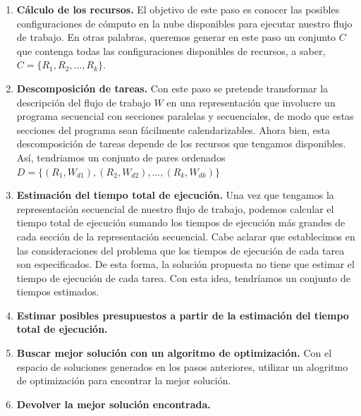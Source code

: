 \documentclass[letterpaper, 12pt]{report}
\begin{document}
\begin{enumerate}
\item \textbf{Cálculo de los recursos.} El objetivo de este paso es conocer las posibles configuraciones de cómputo en la nube disponibles para ejecutar nuestro flujo de trabajo. En otras palabras, queremos generar en este paso un conjunto $C$ que contenga todas las configuraciones disponibles de recursos, a saber, $C = \{ R_1, R_2, \dots, R_k \}$.
\item \textbf{Descomposición de tareas.} Con este paso se pretende transformar la descripción del flujo de trabajo $W$ en una representación que involucre un programa secuencial con secciones paralelas y secuenciales, de modo que estas secciones del programa sean fácilmente calendarizables. Ahora bien, esta descomposición de tareas depende de los recursos que tengamos disponibles. Así, tendriamos un conjunto de pares ordenados $D =\{(R_1, W_{d1}), (R_2, W_{d2}), \dots, (R_k, W_{dk})\}$
\item \textbf{Estimación del tiempo total de ejecución.} Una vez que tengamos la representación secuencial de nuestro flujo de trabajo, podemos calcular el tiempo total de ejecución sumando los tiempos de ejecución más grandes de cada sección de la representación secuencial. Cabe aclarar que establecimos en las consideraciones del problema que los tiempos de ejecución de cada tarea son especificados. De esta forma, la solución propuesta no tiene que estimar el tiempo de ejecución de cada tarea. Con esta idea, tendríamos un conjunto de tiempos estimados.
\item \textbf{Estimar posibles presupuestos a partir de la estimación del tiempo total de ejecución.}
\item \textbf{Buscar mejor solución con un algoritmo de optimización.} Con el espacio de soluciones generados en los pasos anteriores, utilizar un alogritmo de optimización para encontrar la mejor solución.
\item \textbf{Devolver la mejor solución encontrada.}
\end{enumerate}


\renewcommand*{\bibname}{\chapter*{Referencias}}


\end{document}
